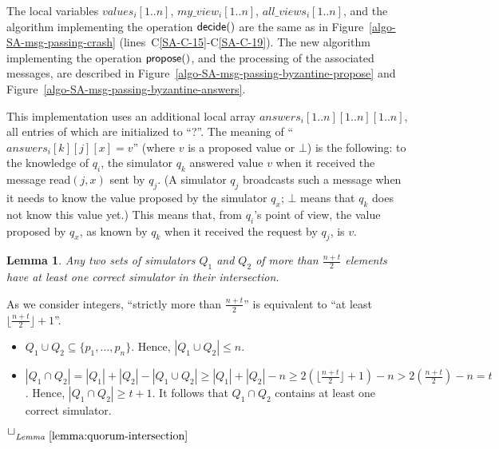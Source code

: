 \documentclass[11pt,letterpaper]{article}
\newtheorem{lemma}{Lemma}
\newlength {\afterproof}
\newcommand{\toto}{xxx}
\newenvironment{proofL}{\noindent{\bf Proof }}
{\hspace*{\fill}$\Box_{\mathit{Lemma}~\ref{\toto}}$\par\vspace{\afterproof}}
\begin{document}
The local variables $values_i[1..n]$, $my\_view_i[1..n]$,
$all\_views_i[1..n]$,  and the algorithm implementing the operation
${\sf decide}()$ are the same as in Figure~\ref{algo-SA-msg-passing-crash}
(lines~C\ref{SA-C-15}-C\ref{SA-C-19}).
The  new algorithm implementing the  operation ${\sf  propose}()$, and the
processing of the associated messages, are  described in
Figure~\ref{algo-SA-msg-passing-byzantine-propose} and
Figure~\ref{algo-SA-msg-passing-byzantine-answers}.


This implementation uses an additional local array
$answers_i[1..n][1..n][1..n]$, all entries of which are initialized to
``?''. The meaning of  ``$answers_i[k][j][x]=v$'' 
(where $v$ is a proposed value or $\bot$) is the following:
to the knowledge of $q_i$, the simulator $q_k$ answered  value $v$ when
it received  the message {\sc read}$(j,x)$ sent by $q_j$.
(A simulator $q_j$ broadcasts such a message when it needs to know the value
proposed by  the simulator $q_x$; $\bot$ means that $q_k$ does not 
know this value yet.) This  means that, from  $q_i$'s point of
view, the value proposed by $q_x$, as known by $q_k$ when it received 
the request by $q_j$, is $v$.



\begin{lemma}
\label{lemma:quorum-intersection}
Any two sets of simulators $Q_1$ and $Q_2$ of more than $\frac{n+t}{2}$
elements have at least one correct simulator in their intersection.
\end{lemma}

\begin{proofL}
As  we   consider  integers,  ``strictly  more  than  $\frac{n+t}{2}$''
is equivalent to ``at least $\lfloor\frac{n+t}{2}\rfloor+1$''.

 \begin{itemize}
\vspace{-0.2cm}
\item
$Q_1\cup Q_2\subseteq \{p_1,\ldots, p_n\}$. Hence, $|Q_1 \cup Q_2|\leq n$.
\vspace{-0.2cm}
\item
$|Q_1\cap Q_2|=|Q_1|+|Q_2|-|Q_1\cup Q_2|\ge |Q_1|+|Q_2|-n \ge
     2(\lfloor\frac{n+t}{2}\rfloor+1)-n>2(\frac{n+t}{2})-n=t$.
Hence,  $|Q_1\cap Q_2|\ge t+1$. It follows that  $Q_1\cap Q_2$
contains at least one correct simulator.
\end{itemize}
\vspace{-0.4cm}
\renewcommand{\toto}{lemma:quorum-intersection}
\end{proofL}
\end{document}
